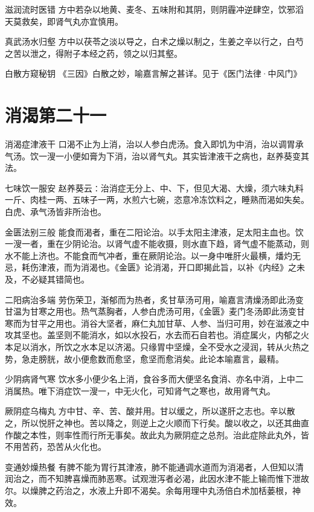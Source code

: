 \documentclass[a4paper,12pt,UTF8,twoside]{ctexbook}
\begin{document}
    滋润流时医错
    方中若杂以地黄、麦冬、五味附和其阴，则阴霾冲逆肆空，饮邪滔天莫救矣，即肾气丸亦宜慎用。
    
    真武汤水归壑
    方中以茯苓之淡以导之，白术之燥以制之，生姜之辛以行之，白芍之苦以泄之，得附子本经之药，领之以归其壑。
    
    白散方窥秘钥
    《三因》白散之妙，喻嘉言解之甚详。见于《医门法律·中风门》
    
    
    
    \chapter{消渴第二十一}
        
    消渴症津液干
    口渴不止为上消，治以人参白虎汤。食入即饥为中消，治以调胃承气汤。饮一溲一小便如膏为下消，治以肾气丸。其实皆津液干之病也，赵养葵变其法。
    
    七味饮一服安
    赵养葵云∶治消症无分上、中、下，但见大渴、大燥，须六味丸料一斤、肉桂一两、五味子一两，水煎六七碗，恣意冷冻饮料之，睡熟而渴如失矣。白虎、承气汤皆非所治也。
    
    金匮法别三般
    能食而渴者，重在二阳论治。以手太阳主津液，足太阳主血也。饮一溲一者，重在少阴论治。以肾气虚不能收摄，则水直下趋，肾气虚不能蒸动，则水不能上济也。不能食而气冲者，重在厥阴论治。以一身中唯肝火最横，燔灼无忌，耗伤津液，而为消渴也。《金匮》论消渴，开口即揭此旨，以补《内经》之未及，不必疑其错简也。
    
    二阳病治多端
    劳伤荣卫，渐郁而为热者，炙甘草汤可用，喻嘉言清燥汤即此汤变甘温为甘寒之用也。热气蒸胸者，人参白虎汤可用，《金匮》麦门冬汤即此汤变甘寒而为甘平之用也。消谷大坚者，麻仁丸加甘草、人参、当归可用，妙在滋液之中攻其坚也。盖坚则不能消水，如以水投石，水去而石自若也。消症属火，内郁之火本足以消水，所饮之水本足以济渴。只缘胃中坚燥，全不受水之浸润，转从火热之势，急走膀胱，故小便愈数而愈坚，愈坚而愈消矣。此论本喻嘉言，最精。
    
    少阴病肾气寒
    饮水多小便少名上消，食谷多而大便坚名食消、亦名中消，上中二消属热。唯下消症饮一溲一，中无火化，可知肾气之寒也，故用肾气丸。
    
    厥阴症乌梅丸
    方中甘、辛、苦、酸并用。甘以缓之，所以遂肝之志也。辛以散之，所以悦肝之神也。苦以降之，则逆上之火顺而下行矣。酸以收之，以还其曲直作酸之本性，则率性而行所无事矣。故此丸为厥阴症之总剂。治此症除此丸外，皆不用苦药，恐苦从火化也。
    
    变通妙燥热餐
    有脾不能为胃行其津液，肺不能通调水道而为消渴者，人但知以清润治之，而不知脾喜燥而肺恶寒。试观泄泻者必渴，此因水津不能上输而惟下泄故尔。以燥脾之药治之，水液上升即不渴矣。余每用理中丸汤倍白术加栝蒌根，神效。
    
\end{document}
